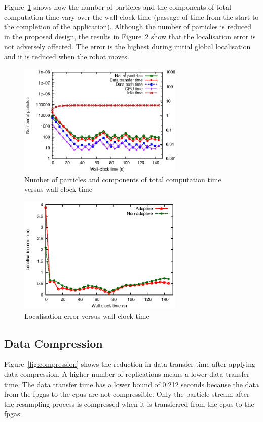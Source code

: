 Figure~\ref{fig:adaptive} shows how the number of particles and the components of total computation time vary over the wall-clock time (passage of time from the start to the completion of the application).
Although the number of particles is reduced in the proposed design, the results in Figure~\ref{fig:error} show that the localisation error is not adversely affected.
The error is the highest during initial global localisation and it is reduced when the robot moves.

\begin{figure}[t!]
\centering
\includegraphics[width=0.7\textwidth]{4_adaptation/figures/fig_adaptive}
\caption{Number of particles and components of total computation time versus wall-clock time}
\label{fig:adaptive}
\end{figure}

\begin{figure}[t!]
\centering
\includegraphics[width=0.7\textwidth]{4_adaptation/figures/fig_error}
\caption{Localisation error versus wall-clock time}
\label{fig:error}
\end{figure}

\subsection{Data Compression}
Figure~\ref{fig:compression} shows the reduction in data transfer time after applying data compression.
A higher number of replications means a lower data transfer time.
The data transfer time has a lower bound of 0.212 seconds because the data from the \gls{fpga}s to the \gls{cpu}s are not compressible.
Only the particle stream after the resampling process is compressed when it is transferred from the \gls{cpu}s to the \gls{fpga}s.

